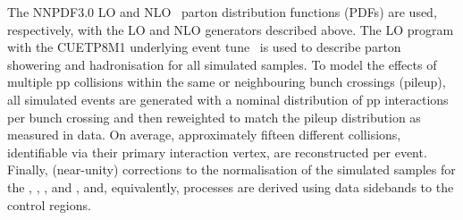 
The \textsc{NNPDF}3.0 LO and NLO~\cite{nnpdf} parton distribution
functions (PDFs) are used, respectively, with the LO and NLO
generators described above. The LO \PYTHIA program with the {\sc
  CUETP8M1} underlying event tune~\cite{Khachatryan:2015pea} is used
to describe parton showering and hadronisation for all simulated
samples. To model the effects of multiple pp collisions within the
same or neighbouring bunch crossings (pileup), all simulated events
are generated with a nominal distribution of pp interactions per bunch
crossing and then reweighted to match the pileup distribution as
measured in data. On average, approximately fifteen different
collisions, identifiable via their primary interaction vertex, are
reconstructed per event. Finally, (near-unity) corrections to the
normalisation of the simulated samples for the \gj, \wmj, \ttbar, and
\zmumuj, and, equivalently, \znunuj processes are derived using data
sidebands to the control regions.
